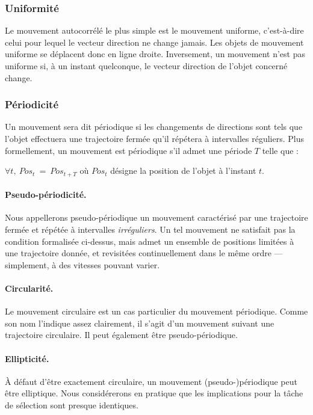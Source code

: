     \subsubsection{Uniformité}
    Le mouvement autocorrélé le plus simple est le mouvement uniforme, c'est-à-dire celui pour lequel le vecteur direction ne change jamais. Les objets de mouvement uniforme se déplacent donc en ligne droite. Inversement, un mouvement n'est pas uniforme si, à un instant quelconque, le vecteur direction de l'objet concerné change.

    \subsubsection{Périodicité}
    Un mouvement sera dit périodique si les changements de directions sont tels que l'objet effectuera une trajectoire fermée qu'il répétera à intervalles réguliers. Plus formellement, un mouvement est périodique s'il admet une période $T$ telle que :
    
    $\forall t,~Pos_{t}~=~Pos_{t+T}$ où $Pos_{t}$ désigne la position de l'objet à l'instant $t$.
    
    \paragraph{Pseudo-périodicité.}
    Nous appellerons pseudo-périodique un mouvement caractérisé par une trajectoire fermée et répétée à intervalles \emph{irréguliers}. Un tel mouvement ne satisfait pas la condition formalisée ci-dessus, mais admet un ensemble de positions limitées à une trajectoire donnée, et revisitées continuellement dans le même ordre --- simplement, à des vitesses pouvant varier.

    \paragraph{Circularité.}
    Le mouvement circulaire est un cas particulier du mouvement périodique. Comme son nom l'indique assez clairement, il s'agit d'un mouvement suivant une trajectoire circulaire. Il peut également être pseudo-périodique.
    
    \paragraph{Ellipticité.}
    À défaut d'être exactement circulaire, un mouvement (pseudo-)périodique peut être elliptique. Nous considérerons en pratique que les implications pour la tâche de sélection sont presque identiques.
    

